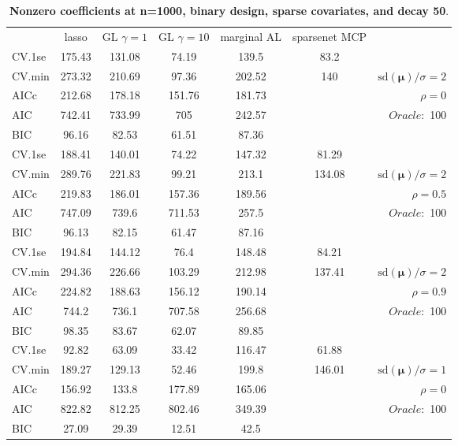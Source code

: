 \begin{table}\vspace{-.5cm}
\caption[l]{ { \bf Nonzero coefficients at n=1000, binary design, 
sparse covariates, and  decay  50}.}
\vspace{-.5cm}
\footnotesize{}
\begin{center}
\begin{tabular}{l*{5}{c}|r}
& lasso & GL $\gamma=1$ & GL $\gamma=10$ & marginal AL & sparsenet MCP  & \\
 \cline{1-7}
CV.1se & 175.43 & 131.08 & 74.19 & 139.5 & 83.2 & \\
CV.min & 273.32 & 210.69 & 97.36 & 202.52 & 140 &  $\mathrm{sd}(\mathbf{\mu})/\sigma=2$ \\
AICc & 212.68 & 178.18 & 151.76 & 181.73 & & $\rho=0$ \\
AIC & 742.41 & 733.99 & 705 & 242.57 & &  \multirow{2}{*}{$Oracle: $ 100} \\
BIC & 96.16 & 82.53 & 61.51 & 87.36 & &  \\
 \hline 
CV.1se & 188.41 & 140.01 & 74.22 & 147.32 & 81.29 & \\
CV.min & 289.76 & 221.83 & 99.21 & 213.1 & 134.08 &  $\mathrm{sd}(\mathbf{\mu})/\sigma=2$ \\
AICc & 219.83 & 186.01 & 157.36 & 189.56 & & $\rho=0.5$ \\
AIC & 747.09 & 739.6 & 711.53 & 257.5 & &  \multirow{2}{*}{$Oracle: $ 100} \\
BIC & 96.13 & 82.15 & 61.47 & 87.16 & &  \\
 \hline 
CV.1se & 194.84 & 144.12 & 76.4 & 148.48 & 84.21 & \\
CV.min & 294.36 & 226.66 & 103.29 & 212.98 & 137.41 &  $\mathrm{sd}(\mathbf{\mu})/\sigma=2$ \\
AICc & 224.82 & 188.63 & 156.12 & 190.14 & & $\rho=0.9$ \\
AIC & 744.2 & 736.1 & 707.58 & 256.68 & &  \multirow{2}{*}{$Oracle: $ 100} \\
BIC & 98.35 & 83.67 & 62.07 & 89.85 & &  \\
 \hline 
CV.1se & 92.82 & 63.09 & 33.42 & 116.47 & 61.88 & \\
CV.min & 189.27 & 129.13 & 52.46 & 199.8 & 146.01 &  $\mathrm{sd}(\mathbf{\mu})/\sigma=1$ \\
AICc & 156.92 & 133.8 & 177.89 & 165.06 & & $\rho=0$ \\
AIC & 822.82 & 812.25 & 802.46 & 349.39 & &  \multirow{2}{*}{$Oracle: $ 100} \\
BIC & 27.09 & 29.39 & 12.51 & 42.5 & &  \\

\end{tabular}
\end{center}
\end{table}
